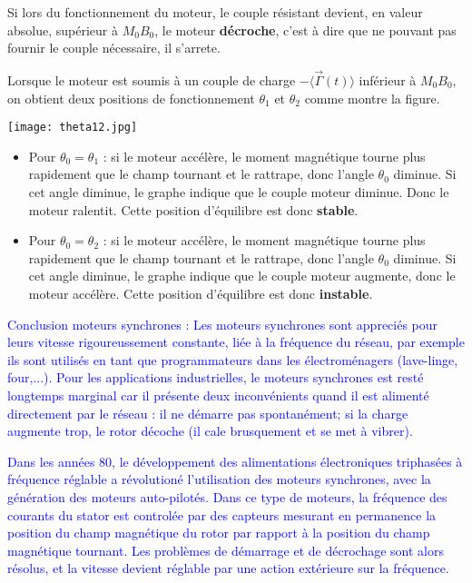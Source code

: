 \documentclass{article}
\begin{document}
Si lors du fonctionnement du moteur, le couple résistant devient, en valeur absolue, supérieur à $M_0B_0$, le moteur \textbf{décroche}, c'est à dire que ne pouvant pas fournir le couple nécessaire, il s'arrete.\medskip

Lorsque le moteur est soumis à un couple de charge $-\langle \vec{\Gamma}(t) \rangle$ inférieur à $M_0 B_0$, on obtient deux positions de fonctionnement $\theta_1$ et $\theta_2$ comme montre la figure.


\begin{center}
    \texttt{[image: theta12.jpg]}
\end{center}


\begin{itemize}
    \item Pour $\theta_0 = \theta_1$ : si le moteur accélère, le moment magnétique tourne plus rapidement que le champ tournant et le rattrape, donc l'angle $\theta_0$ diminue. Si cet angle diminue, le graphe indique que le couple moteur diminue. Donc le moteur ralentit. Cette position d'équilibre est donc \textbf{stable}.
    \item Pour $\theta_0 = \theta_2$ : si le moteur accélère, le moment magnétique tourne plus rapidement que le champ tournant et le rattrape, donc l'angle $\theta_0$ diminue. Si cet angle diminue, le graphe indique que le couple moteur augmente, donc le moteur accélère. Cette position d'équilibre est donc \textbf{instable}.
\end{itemize}

\textcolor{blue}{Conclusion moteurs synchrones : Les moteurs synchrones sont appreciés pour leurs vitesse rigoureussement constante, liée à la fréquence du réseau, par exemple ils sont utilisés en tant que programmateurs dans les électroménagers (lave-linge, four,...). Pour les applications industrielles, le moteurs synchrones est resté longtemps marginal car il présente deux inconvénients quand il est alimenté directement par le réseau : il ne démarre pas spontanément; si la charge augmente trop, le rotor décoche (il cale brusquement et se met à vibrer).}\medskip

\textcolor{blue}{Dans les années 80, le développement des alimentations électroniques triphasées à fréquence réglable a révolutioné l'utilisation des moteurs synchrones, avec la génération des moteurs auto-pilotés. Dans ce type de moteurs, la fréquence des courants du stator est controlée par des capteurs mesurant en permanence la position du champ magnétique du rotor par rapport à la position du champ magnétique tournant. Les problèmes de démarrage et de décrochage sont alors résolus, et la vitesse devient réglable par une action extérieure sur la fréquence.}
\end{document}
